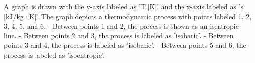 A graph is drawn with the y-axis labeled as 'T [K]' and the x-axis labeled as 's [kJ/kg·K]'. The graph depicts a thermodynamic process with points labeled 1, 2, 3, 4, 5, and 6.  
- Between points 1 and 2, the process is shown as an isentropic line.  
- Between points 2 and 3, the process is labeled as 'isobaric'.  
- Between points 3 and 4, the process is labeled as 'isobaric'.  
- Between points 5 and 6, the process is labeled as 'isoentropic'.